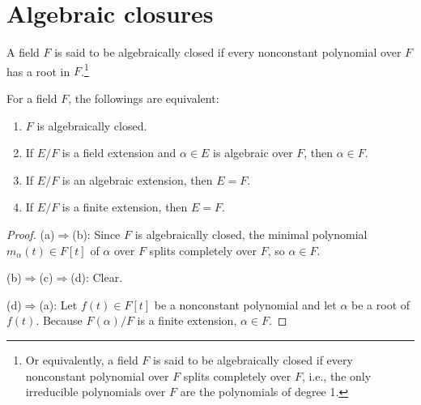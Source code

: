 \section{Algebraic closures}

\begin{defi}
    A field $F$ is said to be algebraically closed if every nonconstant polynomial over $F$ has a root in $F$.\footnote{Or equivalently, a field $F$ is said to be algebraically closed if every nonconstant polynomial over $F$ splits completely over $F$, i.e., the only irreducible polynomials over $F$ are the polynomials of degree 1.}
\end{defi}
\begin{obs}\label{obs: alg. cl.}
    For a field $F$, the followings are equivalent:
    \begin{enumerate}
        \item[(a)]
        {
            $F$ is algebraically closed.
        }
        \item[(b)]
        {
            If $E/F$ is a field extension and $\alpha\in E$ is algebraic over $F$, then $\alpha\in F$.
        }
        \item[(c)]
        {
            If $E/F$ is an algebraic extension, then $E=F$.
        }
        \item[(d)]
        {
            If $E/F$ is a finite extension, then $E=F$.
        }
    \end{enumerate}
\end{obs}
\begin{proof}
    (a)$\Rightarrow$(b):
    Since $F$ is algebraically closed, the minimal polynomial $m_\alpha(t)\in F[t]$ of $\alpha$ over $F$ splits completely over $F$, so $\alpha\in F$.

    (b)$\Rightarrow$(c)$\Rightarrow$(d):
    Clear.

    (d)$\Rightarrow$(a):
    Let $f(t)\in F[t]$ be a nonconstant polynomial and let $\alpha$ be a root of $f(t)$.
    Because $F(\alpha)/F$ is a finite extension, $\alpha\in F$.
\end{proof}

